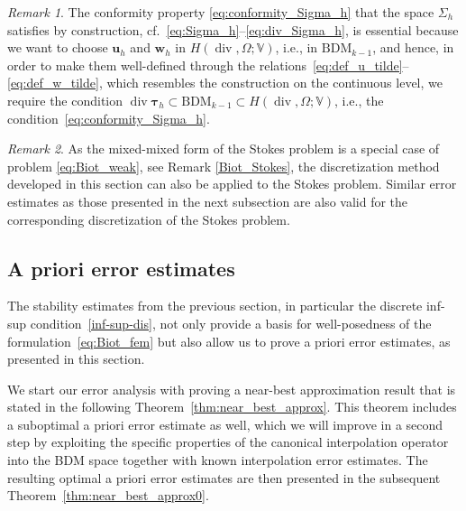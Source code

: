 \documentclass[11pt]{amsart}
\theoremstyle{remark}
\newtheorem{remark}{Remark}
\theoremstyle{definition}
\def\btau{{\bm \tau}}
\def\bu{{\boldsymbol u}}
\def\bw{{\boldsymbol w}}
\def\tbu{{\bu}}
\def\tbw{{\bw}}
\renewcommand{\div}{\operatorname{div}}
\renewcommand{\div}{\operatorname{div}}
\def\bu{\boldsymbol u}
\def\bw{\boldsymbol w}
\begin{document}
\begin{remark}
The conformity property \eqref{eq:conformity_Sigma_h}
that the space $\Sigma_h$ satisfies by construction, cf.~\eqref{eq:Sigma_h}--\eqref{eq:div_Sigma_h}, is essential because we want to choose $\tbu_h$ and $\tbw_h $ in $H(\div , \Omega ; \mathbb{V})$, i.e., in $\text{BDM}_{k-1}$, and hence, in order to make them well-defined through the relations~\eqref{eq:def_u_tilde}--\eqref{eq:def_w_tilde},
which resembles the construction on the continuous level, we require the condition $\div \btau_h \subset \text{BDM}_{k-1} \subset H(\div , \Omega ; \mathbb{V})$, i.e., the condition~\eqref{eq:conformity_Sigma_h}.
\end{remark}

\begin{remark}
As the mixed-mixed form of the Stokes problem is a special case of problem \eqref{eq:Biot_weak}, see Remark \ref{Biot_Stokes},  the discretization method developed in this section can also be applied to the Stokes problem. Similar error estimates as those presented in the next subsection are also valid for the corresponding discretization of the Stokes problem. 
\end{remark}

\subsection{A priori error estimates}\label{subsec:fem_error_estimate} 

The stability estimates from the previous section, in particular the discrete inf-sup condition~\eqref{inf-sup-dis}, not only provide a basis for well-posedness of the formulation~\eqref{eq:Biot_fem} but also allow us to prove a priori error estimates,
as presented in this section.


We start our error analysis with proving a near-best approximation result that is stated in the following Theorem~\ref{thm:near_best_approx}. This theorem includes a suboptimal a priori error estimate as well, which we will improve in a second step by exploiting the specific properties of the canonical interpolation operator
into the BDM space together with known interpolation error estimates. The resulting optimal a priori error
estimates are then presented in the subsequent Theorem~\ref{thm:near_best_approx0}.
\end{document}

